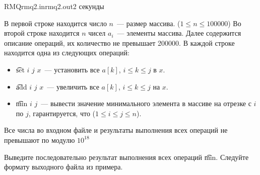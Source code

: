\begin{problem}{RMQ}{rmq2.in}{rmq2.out}{2 секунды}

\InputFile
В первой строке находится число $n$~--- размер массива. ($1 \le n \le 100000$)
Во второй строке находится $n$ чисел $a_i$~--- элементы массива.
Далее содержится описание операций, их количество не превышает 200000.
В каждой строке находится одна из следующих операций:
\begin{itemize}
\item \t{set} $i$ $j$ $x$~--- установить все $a[k]$, $i \le k \le j$ в $x$.
\item \t{add} $i$ $j$ $x$~--- увеличить все $a[k]$, $i \le k \le j$ на $x$.
\item \t{min} $i$ $j$~--- вывести значение минимального элемента в массиве на отрезке с $i$ по $j$, гарантируется, что ($1 \le i \le j \le n$).
\end{itemize}
Все числа во входном файле и результаты выполнения всех операций не превышают по модулю $10^18$

\OutputFile

Выведите последовательно результат выполнения всех операций \t{min}. 
Следуйте формату выходного файла из примера.

\Example

\begin{example}
%
\end{example}

\end{problem}
